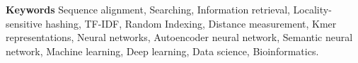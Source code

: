 \smallskip
\textbf{Keywords}
Sequence alignment, Searching, Information retrieval, Locality-sensitive hashing, TF-IDF, Random Indexing, Distance measurement, Kmer representations, Neural networks, Autoencoder neural network, Semantic neural network, Machine learning, Deep learning, Data science, Bioinformatics.
